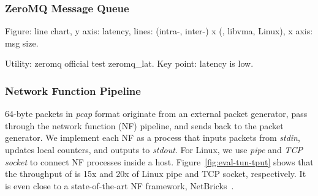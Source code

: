 


\subsubsection{ZeroMQ Message Queue}
\quad

Figure: line chart, y axis: latency, lines: (intra-, inter-) x (\sys{}, libvma, Linux), x axis: msg size.

Utility: zeromq official test zeromq\_lat.
Key point: latency is low.

\subsubsection{Network Function Pipeline}
\quad

64-byte packets in \emph{pcap} format originate from an external packet generator, pass through the network function (NF) pipeline, and sends back to the packet generator.
We implement each NF as a process that inputs packets from \emph{stdin}, updates local counters, and outputs to \emph{stdout}.
For Linux, we use \emph{pipe} and \emph{TCP socket} to connect NF processes inside a host.
Figure~\ref{fig:eval-tun-tput} shows that the throughput of \sys{} is 15x and 20x of Linux pipe and TCP socket, respectively.
It is even close to a state-of-the-art NF framework, NetBricks~\cite{panda2016netbricks}.


